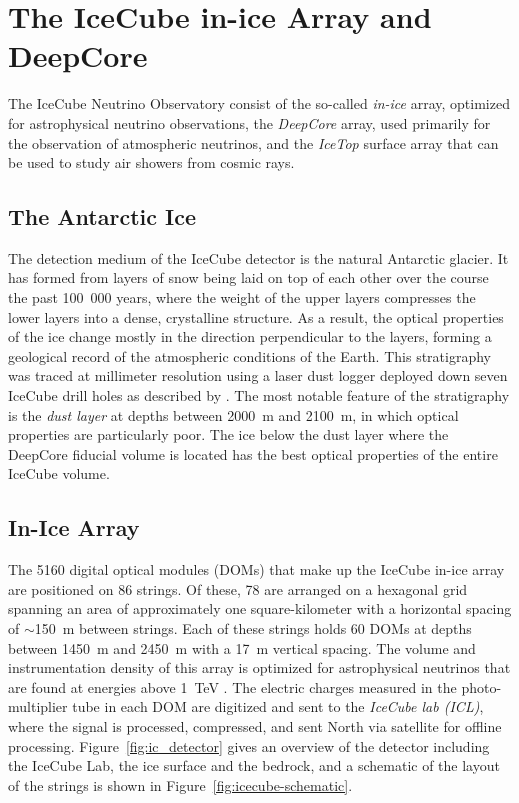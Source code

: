 \section{The IceCube in-ice Array and DeepCore}

The IceCube Neutrino Observatory consist of the so-called \emph{in-ice} array, optimized for astrophysical neutrino observations, the \emph{DeepCore} array, used primarily for the observation of atmospheric neutrinos, and the \emph{IceTop} surface array that can be used to study air showers from cosmic rays.

\subsection{The Antarctic Ice}

The detection medium of the IceCube detector is the natural Antarctic glacier. It has formed from layers of snow being laid on top of each other over the course the past 100~000 years, where the weight of the upper layers compresses the lower layers into a dense, crystalline structure. As a result, the optical properties of the ice change mostly in the direction perpendicular to the layers, forming a geological record of the atmospheric conditions of the Earth. This stratigraphy was traced at millimeter resolution using a laser dust logger deployed down seven IceCube drill holes as described by \cite{dustlogger}. The most notable feature of the stratigraphy is the \emph{dust layer} at depths between 2000~m and 2100~m, in which optical properties are particularly poor. The ice below the dust layer where the DeepCore fiducial volume is located has the best optical properties of the entire IceCube volume.

\subsection{In-Ice Array}
The 5160 digital optical modules (DOMs) that make up the IceCube in-ice array are positioned on 86 strings. Of these, 78 are arranged on a hexagonal grid spanning an area of approximately one square-kilometer with a horizontal spacing of $\sim$150~m between strings. Each of these strings holds 60 DOMs at depths between 1450~m and 2450~m with a 17~m vertical spacing. The volume and instrumentation density of this array is optimized for astrophysical neutrinos that are found at energies above 1~TeV \cite{icecube_detector_17}.
The electric charges measured in the photo-multiplier tube in each DOM are digitized  and sent to the \emph{IceCube lab (ICL)}, where the signal is processed, compressed, and sent North via satellite for offline processing. Figure~\ref{fig:ic_detector} gives an overview of the detector including the IceCube Lab, the ice surface and the bedrock, and a schematic of the layout of the strings is shown in Figure~\ref{fig:icecube-schematic}.

